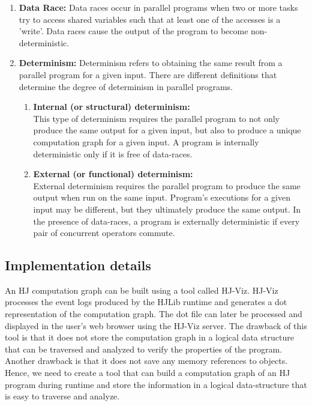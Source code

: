 \begin{enumerate}
\item
\textbf{Data Race:}
Data races occur in parallel programs when two or more tasks try to access shared variables such that at least one of the accesses is a 'write'. Data races cause the output of the program to become non-deterministic. 
\item
\textbf{Determinism:}
Determinism refers to obtaining the same result from a parallel program for a given input. There are different definitions that determine the degree of determinism in parallel programs.
\begin{enumerate}
\item
\textbf{Internal (or structural) determinism:\\}
This type of determinism requires the parallel program to not only produce the same output for a given input, but also to produce a unique computation graph for a given input. A program is internally deterministic only if it is free of data-races.
\item
\textbf{External (or functional) determinism:\\}
External determinism requires the parallel program to produce the same output when run on the same input. Program's executions for a given input may be different, but they ultimately produce the same output. In the presence of data-races, a program is externally deterministic if every pair of concurrent operators commute.
\end{enumerate}
\end{enumerate}

\subsection{Implementation details}
An HJ computation graph can be built using a tool called HJ-Viz. HJ-Viz processes the event logs produced by the HJLib runtime and generates a dot representation of the computation graph. The dot file can later be processed and displayed in the user's web browser using the HJ-Viz server. The drawback of this tool is that it does not store the computation graph in a logical data structure that can be traversed and analyzed to verify the properties of the program. Another drawback is that it does not save any memory references to objects. Hence, we need to create a tool that can build a computation graph of an HJ program during runtime and store the information in a logical data-structure that is easy to traverse and analyze.

